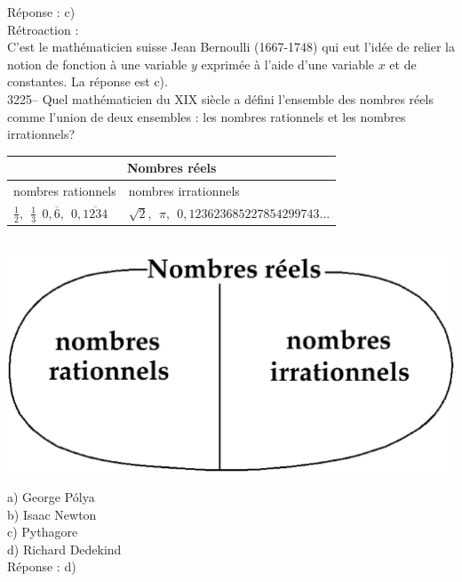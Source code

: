 \documentclass[letterpaper, 12pt]{article}
\begin{document}
R\'eponse : c)\\

R\'etroaction :\\
C'est le math\'ematicien suisse Jean Bernoulli (1667-1748) qui eut l'id\'ee de relier la notion de fonction \`a une variable $y$ exprim\'ee \`a l'aide d'une variable $x$ et de constantes. La r\'eponse est c).\\



3225-- Quel math\'ematicien du {\scriptsize XIX\ieme{}} si\`ecle a d\'efini l'ensemble des nombres r\'eels comme l'union de deux ensembles : les nombres rationnels et les nombres irrationnels?
\begin{center}
\begin{tabular}{|p{7cm}|p{7cm}|}
\multicolumn{2}{c}{{\bf Nombres r\'eels}}\\ \hline
nombres rationnels & nombres irrationnels\\[5mm]
$\frac{1}{2}, \ \ \frac{1}{3} \ \ 0,\overline{6}, \ \ 0,\overline{1234}$ & $\sqrt{2}, \ \ \pi, \ \ 0,123623685227854299743\dots$\\[2mm] \hline
\end{tabular}\\[5mm]
\includegraphics[scale=0.25]{ensR.eps}\\
\end{center}

a) George P\'olya\\
b) Isaac Newton\\
c) Pythagore\\
d) Richard Dedekind\\

R\'eponse : d)\\
\end{document}
